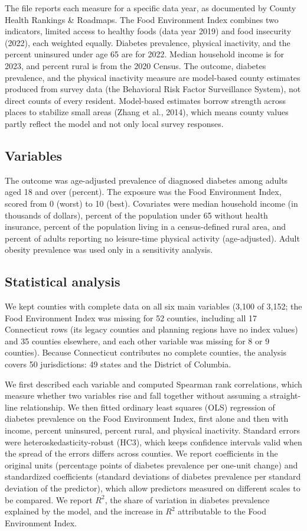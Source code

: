 \documentclass[12pt]{article}
\begin{document}
The file reports each measure for a specific data year, as documented by County Health Rankings \& Roadmaps. The Food Environment Index combines two indicators, limited access to healthy foods (data year 2019) and food insecurity (2022), each weighted equally. Diabetes prevalence, physical inactivity, and the percent uninsured under age 65 are for 2022. Median household income is for 2023, and percent rural is from the 2020 Census. The outcome, diabetes prevalence, and the physical inactivity measure are model-based county estimates produced from survey data (the Behavioral Risk Factor Surveillance System), not direct counts of every resident. Model-based estimates borrow strength across places to stabilize small areas (Zhang et al., 2014), which means county values partly reflect the model and not only local survey responses.

\subsection*{Variables}
The outcome was age-adjusted prevalence of diagnosed diabetes among adults aged 18 and over (percent). The exposure was the Food Environment Index, scored from 0 (worst) to 10 (best). Covariates were median household income (in thousands of dollars), percent of the population under 65 without health insurance, percent of the population living in a census-defined rural area, and percent of adults reporting no leisure-time physical activity (age-adjusted). Adult obesity prevalence was used only in a sensitivity analysis.

\subsection*{Statistical analysis}
We kept counties with complete data on all six main variables (3,100 of 3,152; the Food Environment Index was missing for 52 counties, including all 17 Connecticut rows (its legacy counties and planning regions have no index values) and 35 counties elsewhere, and each other variable was missing for 8 or 9 counties). Because Connecticut contributes no complete counties, the analysis covers 50 jurisdictions: 49 states and the District of Columbia.

We first described each variable and computed Spearman rank correlations, which measure whether two variables rise and fall together without assuming a straight-line relationship. We then fitted ordinary least squares (OLS) regression of diabetes prevalence on the Food Environment Index, first alone and then with income, percent uninsured, percent rural, and physical inactivity. Standard errors were heteroskedasticity-robust (HC3), which keeps confidence intervals valid when the spread of the errors differs across counties. We report coefficients in the original units (percentage points of diabetes prevalence per one-unit change) and standardized coefficients (standard deviations of diabetes prevalence per standard deviation of the predictor), which allow predictors measured on different scales to be compared. We report $R^2$, the share of variation in diabetes prevalence explained by the model, and the increase in $R^2$ attributable to the Food Environment Index.
\end{document}
